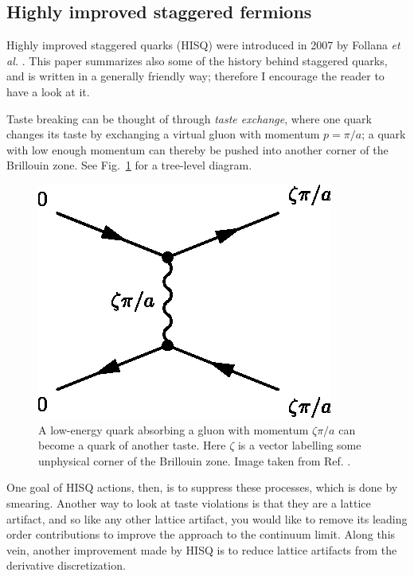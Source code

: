 \subsection{Highly improved staggered fermions}\label{sec:HISQ}

Highly improved staggered quarks (HISQ) were introduced in 2007 by
Follana {\it et al.} \cite{follana_highly_2007}. This paper summarizes also
some of the history behind staggered quarks, and is written in a generally
friendly way; therefore I encourage the reader to have a look at it.

Taste breaking can be thought of through {\it taste exchange}, where
one quark changes its taste by exchanging a virtual gluon with momentum
$p=\pi/a$; a quark with low enough momentum can thereby be pushed into
another corner of the Brillouin zone. See Fig.~\ref{fig:treeLevelTasteExchange}
for a tree-level diagram.
\begin{figure}[t]
  \centering
  \includegraphics{figs/treelevel.eps}
  \caption{A low-energy quark absorbing a gluon with momentum $\zeta\pi/a$
           can become a quark of another taste. Here $\zeta$ is a vector
           labelling some unphysical corner of the Brillouin zone. Image
           taken from Ref. \cite{follana_highly_2007}.
           }
  \label{fig:treeLevelTasteExchange}
\end{figure}
One goal of HISQ actions, then, is to suppress these processes, which is
done by smearing. Another way to look at taste violations is that they
are a lattice artifact, and so like any other lattice artifact, you would
like to remove its leading order contributions to improve the
approach to the continuum limit. Along this vein, another improvement
made by HISQ is to reduce lattice artifacts from the derivative discretization.

